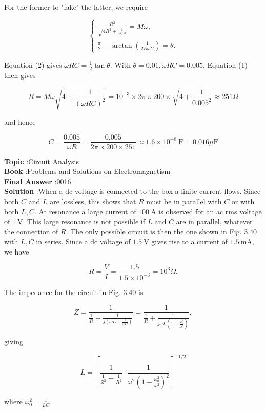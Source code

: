 \documentclass[10pt]{article}
\begin{document}
For the former to "fake" the latter, we require

$$
\left\{\begin{array}{l}
\frac{R^{2}}{\sqrt{4 R^{2}+\frac{1}{\omega^{2} C^{2}}}}=M \omega, \\
\frac{\pi}{2}-\arctan \left(\frac{1}{2 R \omega C}\right)=\theta .
\end{array}\right.
$$

Equation (2) gives $\omega R C=\frac{1}{2} \tan \theta$. With $\theta=0.01, \omega R C=0.005$. Equation (1) then gives

$$
R=M \omega \sqrt{4+\frac{1}{(\omega R C)^{2}}}=10^{-3} \times 2 \pi \times 200 \times \sqrt{4+\frac{1}{0.005^{2}}} \approx 251 \Omega
$$

and hence

$$
C=\frac{0.005}{\omega R}=\frac{0.005}{2 \pi \times 200 \times 251} \approx 1.6 \times 10^{-8} \mathrm{~F}=0.016 \mu \mathrm{F}
$$

\textbf{Topic} :Circuit Analysis\\
\textbf{Book} :Problems and Solutions on Electromagnetism\\
\textbf{Final Answer} :0016 \mu {}\\


\textbf{Solution} :When a dc voltage is connected to the box a finite current flows. Since both $C$ and $L$ are lossless, this shows that $R$ must be in parallel with $C$ or with both $L, C$. At resonance a large current of $100 \mathrm{~A}$ is observed for an ac rms voltage of $1 \mathrm{~V}$. This large resonance is not possible if $L$ and $C$ are in parallel, whatever the connection of $R$. The only possible circuit is then the one shown in Fig. $3.40$ with $L, C$ in series. Since a dc voltage of $1.5 \mathrm{~V}$ gives rise to a current of $1.5 \mathrm{~mA}$, we have

$$
R=\frac{V}{I}=\frac{1.5}{1.5 \times 10^{-3}}=10^{3} \Omega .
$$

The impedance for the circuit in Fig. $3.40$ is

$$
Z=\frac{1}{\frac{1}{R}+\frac{1}{j\left(\omega L-\frac{1}{\omega C}\right)}}=\frac{1}{\frac{1}{R}+\frac{1}{j \omega L\left(1-\frac{\omega_{0}^{2}}{\omega^{2}}\right)}},
$$

giving

$$
L=\left[\frac{1}{\frac{1}{Z^{2}}-\frac{1}{R^{2}}} \cdot \frac{1}{\omega^{2}\left(1-\frac{\omega_{0}^{2}}{\omega^{2}}\right)^{2}}\right]^{-1 / 2}
$$

where $\omega_{0}^{2}=\frac{1}{L C}$
\end{document}
